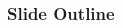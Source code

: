 \begin{frame}[c]
  \frametitle{Slide Outline}

  \begin{columns}[t] %
      \begin{column}{0.5\textwidth}
        \setlength{\itemsep}{2em} %
          \tableofcontents[sections={1-6}] %
      \end{column}

      \begin{column}{0.5\textwidth}
          \tableofcontents[sections={7-13}] %
      \end{column}
  \end{columns}

\end{frame}

